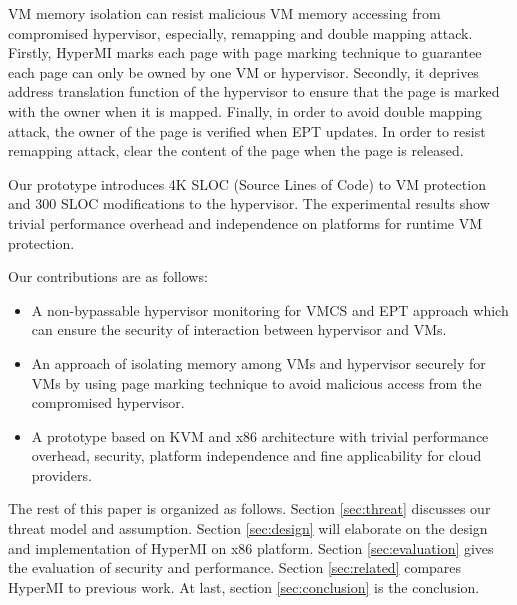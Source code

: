 \documentclass[conference]{IEEEtran}
\begin{document}
VM memory isolation can resist malicious VM memory accessing from compromised hypervisor, especially, remapping and double mapping attack.
Firstly, HyperMI marks each page with page marking technique to guarantee each page can only be owned by one VM or hypervisor.
Secondly, it deprives address translation function of the hypervisor to ensure that the page is marked with the owner when it is mapped. 
Finally, in order to avoid double mapping attack, the owner of the page is verified when EPT updates.
In order to resist remapping attack, clear the content of the page when the page is released.



Our prototype introduces 4K SLOC (Source Lines of Code) to VM protection and 300 SLOC modifications to the hypervisor.
The experimental results show trivial performance overhead and independence on platforms for runtime VM protection. 


Our contributions are as follows:
\begin{itemize}
\item{A non-bypassable hypervisor monitoring for VMCS and EPT approach  which can ensure the security of interaction between hypervisor and VMs.}
\item{An approach of isolating memory among VMs and hypervisor securely for VMs by using page marking technique to avoid malicious access from the compromised hypervisor.}



\item{A prototype based on KVM and x86 architecture with trivial performance overhead, security, platform independence and fine applicability  for cloud providers.}

\end{itemize}
The rest of this paper is organized as follows. Section \ref{sec:threat} discusses our threat model and assumption. Section \ref{sec:design} will elaborate on the design and implementation of HyperMI on x86 platform. Section \ref{sec:evaluation} gives the evaluation of security and performance. Section \ref{sec:related} compares HyperMI to previous work. At last, section \ref{sec:conclusion} is the conclusion.
 
\end{document}
